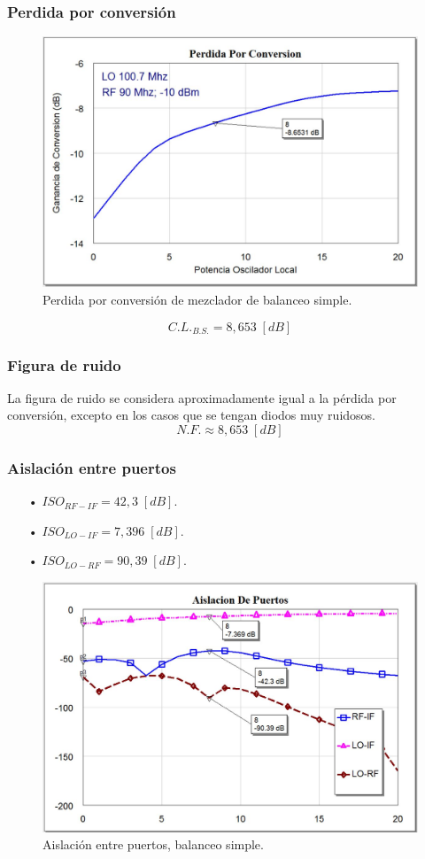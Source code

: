 \documentclass[twocolumn]{article}
\begin{document}
\subsubsection{Perdida por conversión}
%
\begin{figure}[h]
  \centering    
	\includegraphics[width=\columnwidth]{imagenes/CL2.jpg}
	\caption{Perdida por conversión de mezclador de balanceo simple.}\label{fig:CL2}
\end{figure}
\[C.L._{B.S.} = 8,653 \; [dB] \]
%
\subsubsection{Figura de ruido}
%
La figura de ruido se considera aproximadamente igual a la pérdida por conversión, excepto en los casos que se tengan diodos muy ruidosos.
\[N.F. \approx 8,653 \; [dB] \]
%
\subsubsection{Aislación entre puertos}
%
\begin{itemize}\itemsep0em
\item[•]  $ISO_{RF-IF} = 42,3 \; [dB]$.
\item[•]  $ISO_{LO-IF} = 7,396 \; [dB]$.
\item[•]  $ISO_{LO-RF} = 90,39 \; [dB]$.
\end{itemize}
%
\begin{figure}[h!]
  \centering    
	\includegraphics[scale=0.3]{imagenes/ISO2.jpg}
	\caption{Aislación entre puertos, balanceo simple.}\label{fig:ISO2}
\end{figure}
\clearpage
%
\end{document}
